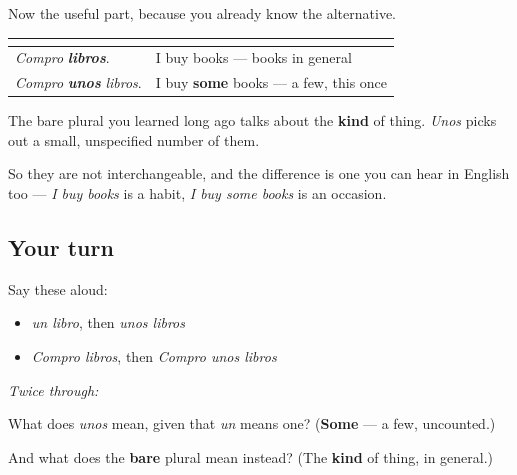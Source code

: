 \begin{culture}
Now the useful part, because you already know the alternative.

\noindent
\begin{tabularx}{\linewidth}{@{}>{\raggedright\arraybackslash}X>{\raggedright\arraybackslash}X@{}}
\toprule
\textbf{} & \textbf{} \\
\midrule
\emph{Compro} \emph{\textbf{libros}}. & I buy books — books in general \\
\emph{Compro} \emph{\textbf{unos}} \emph{libros}. & I buy \textbf{some} books — a few, this once \\
\bottomrule
\end{tabularx}

The bare plural you learned long ago talks about the \textbf{kind} of thing. \emph{Unos} picks out a small, unspecified number of them.

So they are not interchangeable, and the difference is one you can hear in English too — \emph{I buy books} is a habit, \emph{I buy some books} is an occasion.
\end{culture}

\subsection*{Your turn}
Say these aloud:

\begin{itemize}
\raggedright
  \item \emph{un libro}, then \emph{unos libros}
  \item \emph{Compro libros}, then \emph{Compro unos libros}
\end{itemize}

\emph{Twice through:}

\begin{tcolorbox}[breakable,colback=teal!4,colframe=teal!35!black,title={Before you move on}]
What does \emph{unos} mean, given that \emph{un} means one? (\textbf{Some} — a few, uncounted.)

And what does the \textbf{bare} plural mean instead? (The \textbf{kind} of thing, in general.)
\end{tcolorbox}
